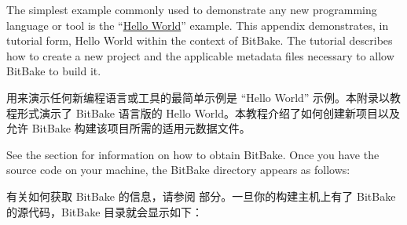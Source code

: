 % 
% 
% 



The simplest example commonly used to demonstrate any new programming language or tool is the “\href{http://en.wikipedia.org/wiki/Hello_world_program}{Hello World}” example. This appendix demonstrates, in tutorial form, Hello World within the context of BitBake. The tutorial describes how to create a new project and the applicable metadata files necessary to allow BitBake to build it.

用来演示任何新编程语言或工具的最简单示例是 ``Hello World'' 示例。本附录以教程形式演示了 BitBake 语言版的 Hello World。本教程介绍了如何创建新项目以及允许 BitBake 构建该项目所需的适用元数据文件。


See the  section for information on how to obtain BitBake. Once you have the source code on your machine, the BitBake directory appears as follows:

有关如何获取 BitBake 的信息，请参阅  部分。一旦你的构建主机上有了 BitBake 的源代码，BitBake 目录就会显示如下：

